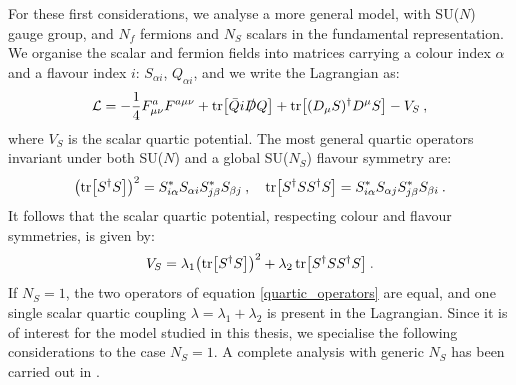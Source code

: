 For these first considerations, we analyse a more general model, with SU($N$) gauge group, and $N_f$ fermions and $N_S$ scalars in the fundamental representation.
We organise the scalar and fermion fields into matrices carrying a colour index $\alpha$ and a flavour index $i$: $S_{\alpha i}$, $Q_{\alpha i}$, and we write the Lagrangian as:
\begin{equation}
\mathcal L = -\frac{1}{4} F_{\mu\nu}^a F^{a \mu\nu} + \tr \bigl[ \bar Q i \slashed D Q\bigr] + \tr \bigl[ (D_{\mu}S)^{\dagger} D^{\mu} S\bigr] - V_S \: ,
\end{equation}
%
where $V_S$ is the scalar quartic potential. The most general quartic operators invariant under both SU($N$) and a global SU($N_S$) flavour symmetry are:
\begin{equation}
\bigl( \tr \bigl[ S^{\dagger} S \bigr] \bigr)^2 = S^*_{i \alpha} S_{\alpha i} S^*_{j \beta} S_{\beta j} \: , \quad 
\tr \bigl[ S^{\dagger} S S^{\dagger} S \bigr] = S^*_{i \alpha} S_{\alpha j} S^*_{j \beta} S_{\beta i} \: .
\label{quartic_operators}
\end{equation}
%
It follows that the scalar quartic potential, respecting colour and flavour symmetries, is given by:
\begin{equation}
V_S = \lambda_1 \bigl( \tr \bigl[ S^{\dagger} S \bigr] \bigr)^2 + \lambda_2 \tr \bigl[ S^{\dagger} S S^{\dagger} S \bigr]  \: .
\label{quartic_potential}
\end{equation}
%
If $N_S =1$, the two operators of equation \ref{quartic_operators} are equal, and one single scalar quartic coupling $\lambda = \lambda_1 + \lambda_2$ is present in the Lagrangian. Since it is of interest for the model studied in this thesis, we specialise the following considerations to the case $N_S = 1$. A complete analysis with generic $N_S$ has been carried out in \cite{Hansen:2017pwe}.

